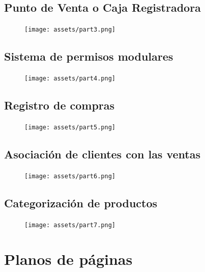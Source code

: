 \documentclass{article}
\begin{document}
\newpage

\subsection{Punto de Venta o Caja Registradora}
\begin{figure}[h]
\centering
\texttt{[image: assets/part3.png]}
\end{figure}

\newpage
\subsection{Sistema de permisos modulares}
\begin{figure}[h]
\centering
\texttt{[image: assets/part4.png]}
\end{figure}

\newpage
\subsection{Registro de compras}
\begin{figure}[h]
\centering
\texttt{[image: assets/part5.png]}
\end{figure}


\subsection{Asociación de clientes con las ventas}
\begin{figure}[h]
\centering
\texttt{[image: assets/part6.png]}
\end{figure}

\newpage
\subsection{Categorización de productos}
\begin{figure}[h]
\centering
\texttt{[image: assets/part7.png]}
\end{figure}
\clearpage


\newpage
\section{Planos de p\'aginas}
\end{document}
